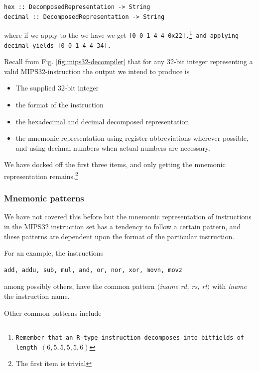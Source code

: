 \begin{verbatim}
hex :: DecomposedRepresentation -> String
decimal :: DecomposedRepresentation -> String
\end{verbatim}

where if we apply  to the \decomposedm we have
we get \tt{[0 0 1 4 4 0x22]}.\footnote{Remember that an R-type instruction
decomposes into bitfields of length $(6, 5, 5, 5, 5, 6)$} and applying
\texttt{decimal} yields \tt{[0 0 1 4 4 34]}.

Recall from Fig. \ref{fig:mips32-decompiler} that for any 32-bit integer
representing a valid MIPS32-instruction the output we intend to produce is

\begin{itemize}
  \item The supplied 32-bit integer
  \item the format of the instruction
  \item the hexadecimal and decimal decomposed representation
  \item the mnemonic representation using register
          abbreviations wherever possible, and using decimal numbers
          when actual numbers are necessary.
\end{itemize}

We have docked off the first three items, and only getting the
mnemonic representation remains.\footnote{The first item is trivial}

\subsubsection{Mnemonic patterns}

We have not covered this before but the mnemonic representation of
instructions in the MIPS32 instruction set has a tendency to follow
a certain pattern, and these patterns are dependent upon the format of
the particular instruction.

For an example, the instructions

\begin{verbatim}
add, addu, sub, mul, and, or, nor, xor, movn, movz
\end{verbatim}

among possibly others, have the common pattern \emph{$\langle$iname
rd, rs, rt$\rangle$} with
\emph{iname} the instruction name.

\newcommand{\pattern}[1]{\emph{$\langle$#1$\rangle$}}

Other common patterns include 

